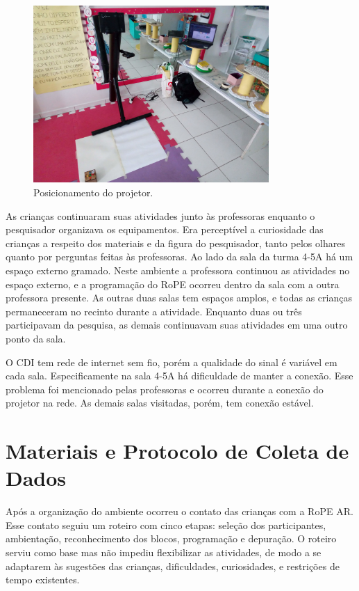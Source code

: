 \begin{figure}[!h]
    \centering
    \includegraphics[width=0.8\textwidth,fbox]{figs/setting_projector.jpg}
    \caption{Posicionamento do projetor.}
    \label{fig:setting}
\end{figure}

As crianças continuaram suas atividades junto às professoras enquanto o pesquisador organizava os equipamentos. Era perceptível a curiosidade das crianças a respeito dos materiais e da figura do pesquisador, tanto pelos olhares quanto por perguntas feitas às professoras. Ao lado da sala da turma 4-5A há um espaço externo gramado. Neste ambiente a professora continuou as atividades no espaço externo, e a programação do RoPE ocorreu dentro da sala com a outra professora presente. As outras duas salas tem espaços amplos, e todas as crianças permaneceram no recinto durante a atividade. Enquanto duas ou três participavam da pesquisa, as demais continuavam suas atividades em uma outro ponto da sala.

O CDI tem rede de internet sem fio, porém a qualidade do sinal é variável em cada sala. Especificamente na sala 4-5A há dificuldade de manter a conexão. Esse problema foi mencionado pelas professoras e ocorreu durante a conexão do projetor na rede. As demais salas visitadas, porém, tem conexão estável.

\section{Materiais e Protocolo de Coleta de Dados}
\label{sec:protocolo}
Após a organização do ambiente ocorreu o contato das crianças com a RoPE AR. Esse contato seguiu um roteiro com cinco etapas: seleção dos participantes, ambientação, reconhecimento dos blocos, programação e depuração. O roteiro serviu como base mas não impediu flexibilizar as atividades, de modo a se adaptarem às sugestões das crianças, dificuldades, curiosidades, e restrições de tempo existentes.


